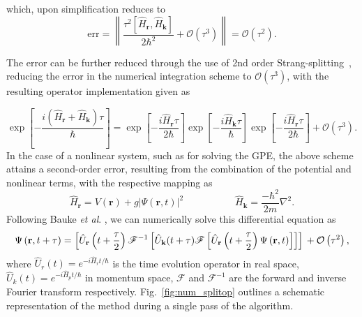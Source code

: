 which, upon simplification reduces to
\begin{equation}
\text{err} = \left\| \frac{\tau^2[{\hat{H}_{\textbf{r}}},{\hat{H}_{\textbf{k}}}]}{2\hbar^2} + \mathcal{O}(\tau^3)\right\| = \mathcal{O}(\tau^2).
\end{equation}

The error can be further reduced through the use of 2nd order Strang-splitting~\cite{strang-splitting}, reducing the error in the numerical integration scheme to $\mathcal{O}(\tau^3)$, with the resulting operator implementation given as

\begin{equation}\label{eqn:3}
\exp\left[ -\frac{ i\left(\hat{H}_{\textbf{r}} + \hat{H}_{\textbf{k}}\right)\tau}{\hbar} \right] = \exp\left[- \frac{i\hat{H}_{\textbf{r}}\tau}{2\hbar} \right]\exp\left[-\frac{i\hat{H}_{\textbf{k}}\tau}{\hbar}\right]\exp\left[ -\frac{i\hat{H}_{\textbf{r}}\tau}{2\hbar}\right] + \mathcal{O}\left(\tau^3\right).
\end{equation}
In the case of a nonlinear system, such as for solving the GPE, the above scheme attains a second-order error, resulting from the combination of the potential and nonlinear terms, with the respective mapping as \cite{BEC:Javanainen_jphysa_2006}
\begin{equation}
\hat{H}_{\textbf{r}} = V(\mathbf{r}) + g\vert\Psi(\mathbf{r},t)\vert^2\; \hspace{5em} \hat{H}_{\textbf{k}} = \frac{-\hbar^2}{2m}\nabla^2.
\end{equation}
Following Bauke \textit{et al}. \cite{Num:Bauke_cpc_2011}, we can numerically solve this differential equation as
\begin{equation}
\Psi\left(\textbf{r},t+\tau\right) = \left[\hat{U}_{\mathbf{r}}\left(t+\frac{\tau}{2}\right) \mathscr{F}^{-1} \left[ \hat{U}_{\mathbf{k}}(t+\tau) \mathscr{F} \left[ \hat{U}_{\mathbf{r}}\left(t+\frac{\tau}{2}\right) \Psi\left(\mathbf{r},t\right) \right] \right] \right]  \\ + \mathcal{O}\left(\tau^2\right),
\end{equation}
where $\hat{U}_{r}(t)=e^{-i\hat{H}_{r}t/\hbar}$ is the time evolution operator in real space, $\hat{U}_{k}(t)=e^{-i\hat{H}_{p}t/\hbar}$ in momentum space,  $\mathscr{F}$ and $\mathscr{F}^{-1}$ are the forward and inverse Fourier transform respectively. Fig.~\ref{fig:num_splitop} outlines a schematic representation of the method during a single pass of the algorithm.

